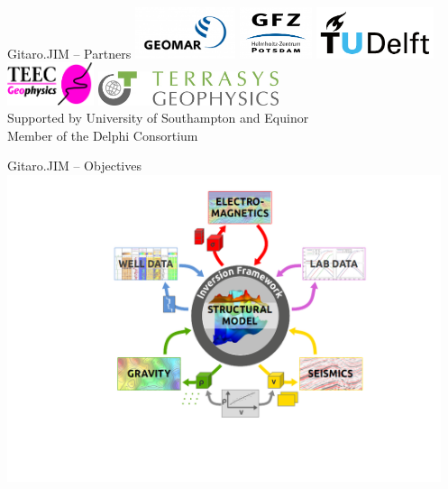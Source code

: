 \documentclass[xcolor=svgnames, aspectratio=169]{beamer}
\begin{document}
  \begin{frame}[t]%
    {Gitaro.JIM -- Partners}
    \centering
    \hfill
    \includegraphics[height=1.5cm]{Logo-GEOMAR-300x153}
    \hfill
    \includegraphics[height=1.5cm]{Logo-GFZ-300x211}
    \hfill
    \includegraphics[height=1.5cm]{TU_Delft_logo_RGB}
    \hfill~\\[1cm]
    \hfill
    \includegraphics[height=1.25cm]{Logo-TEEC-207x102}
    \hfill
    \includegraphics[height=1cm]{Logo-TERRASYS-768x145}
    \hfill~\\
    \vfill
    Supported by \alert{University of Southampton} and \alert{Equinor}\\[.5em]
    Member of the \alert{Delphi Consortium}
  \end{frame}

  \begin{frame}%
    {Gitaro.JIM -- Objectives}
    \includegraphics[height=9cm]{InversionFramework}
  \end{frame}
\end{document}
